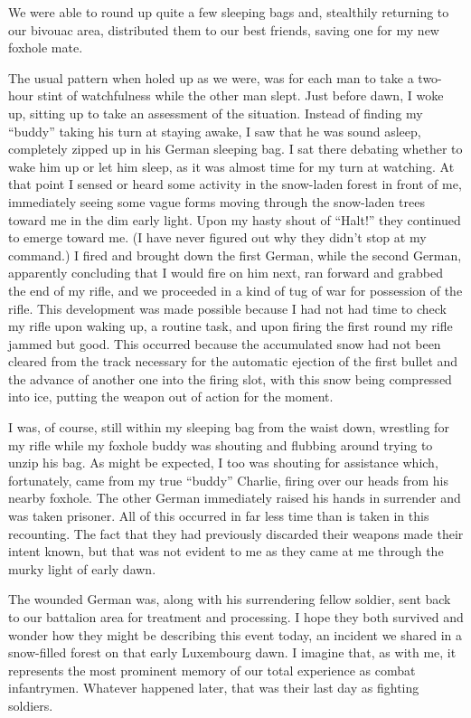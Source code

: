 \documentclass[../m3y]{subfiles}
\begin{document}
We were able to round up quite a few sleeping bags and, stealthily returning to our bivouac area, distributed them to our best friends, saving one for my new foxhole mate.

The usual pattern when holed up as we were, was for each man to take a two-hour stint of watchfulness while the other man slept. Just before dawn, I woke up, sitting up to take an  assessment of the situation. Instead of finding my ``buddy'' taking his turn at staying awake, I saw that he was sound asleep, completely zipped up in his German sleeping bag. I sat there debating whether to wake him up or let him sleep, as it was almost time for my turn at watching. At that point I sensed or heard some activity in the snow-laden forest in front of me, immediately seeing some vague forms moving through the snow-laden trees toward me in the dim early light. Upon my hasty shout of ``Halt!'' they continued to emerge toward me. (I have never figured out why they didn't stop at my command.) I fired and brought down the first German, while the second German, apparently concluding that I would fire on him next, ran forward and grabbed the end of my rifle, and we proceeded in a kind of tug of war for possession of the rifle. This development was made possible because I had not had time to check my rifle upon waking up, a routine task, and upon firing the first round my rifle jammed but good. This occurred because the accumulated snow had not been cleared from the track necessary for the automatic ejection of the first bullet and the advance of another one into the firing slot, with this snow being compressed into ice, putting the weapon out of action for the moment.

I was, of course, still within my sleeping bag from the waist down, wrestling for my rifle while my foxhole buddy was shouting and flubbing around trying to unzip his bag. As might be expected, I too was shouting for assistance which, fortunately, came from my true ``buddy'' Charlie, firing over our heads from his nearby foxhole. The other German immediately raised his hands in surrender and was taken prisoner. All of this occurred in far less time than is taken in this recounting. The fact that they had previously discarded their weapons made their intent known, but that was not evident to me as they came at me through the murky light of early dawn.

The wounded German was, along with his surrendering fellow soldier, sent back to our battalion area for treatment and processing. I hope they both survived and wonder how they might be describing this event today, an incident we shared in a snow-filled forest on that early Luxembourg dawn. I imagine that, as with me, it represents the most prominent memory of our total experience as combat infantrymen. Whatever happened later, that was their last day as fighting soldiers.
\end{document}
